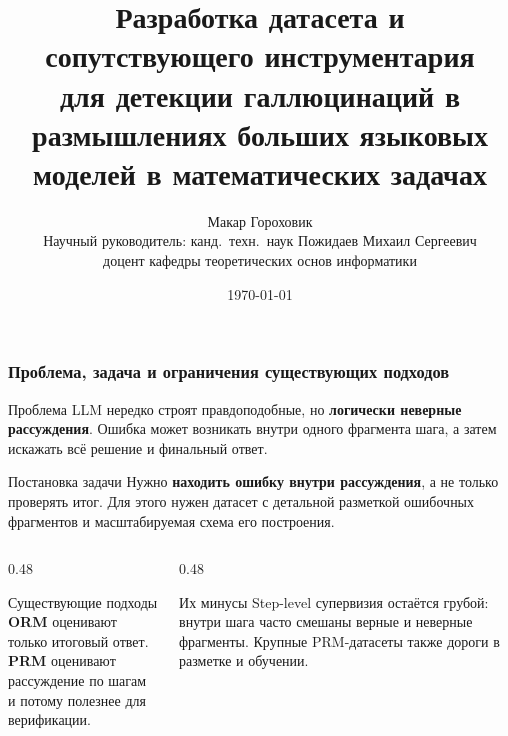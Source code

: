 \documentclass{beamer}
\title[Разработка датасета для детекции галлюцинаций]{Разработка датасета и сопутствующего инструментария\texorpdfstring{\\}{} для детекции галлюцинаций в размышлениях больших языковых моделей в математических задачах}
\author[Макар Гороховик]{\texorpdfstring{Макар Гороховик\\[0.4em]\small Научный руководитель: канд.\ техн.\ наук Пожидаев Михаил Сергеевич\\\small доцент кафедры теоретических основ информатики}{Макар Гороховик, научный руководитель: Пожидаев Михаил Сергеевич}}
\date{\today}
\begin{document}
\maketitle


\begin{frame}
  \frametitle{Проблема, задача и ограничения существующих подходов}
  \scriptsize

  \begin{alertblock}{Проблема}
      LLM нередко строят правдоподобные, но \textbf{логически неверные рассуждения}. Ошибка может возникать внутри одного фрагмента шага, а затем искажать всё решение и финальный ответ.
  \end{alertblock}

  \begin{block}{Постановка задачи}
      Нужно \textbf{находить ошибку внутри рассуждения}, а не только проверять итог. Для этого нужен датасет с детальной разметкой ошибочных фрагментов и масштабируемая схема его построения.
  \end{block}

  \begin{columns}[T]
      \begin{column}{0.48\textwidth}
          \begin{block}{Существующие подходы}
              \textbf{ORM} оценивают только итоговый ответ. \\
              \textbf{PRM} оценивают рассуждение по шагам и потому полезнее для верификации.
          \end{block}
      \end{column}
      \begin{column}{0.48\textwidth}
          \begin{block}{Их минусы}
              Step-level супервизия остаётся грубой: внутри шага часто смешаны верные и неверные фрагменты. Крупные PRM-датасеты также дороги в разметке и обучении.
          \end{block}
      \end{column}
  \end{columns}
\end{frame}
\end{document}
